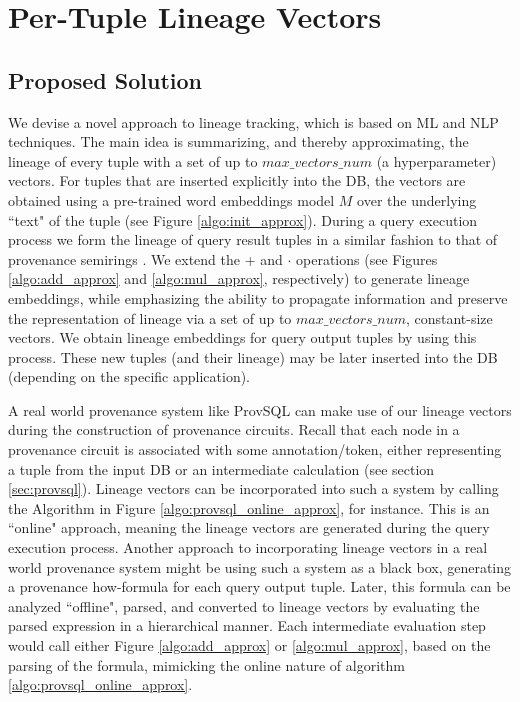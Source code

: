 \chapter{Per-Tuple Lineage Vectors}
\label{chap:per_tuple_lineage_vectors}

\section{Proposed Solution}\label{sec:proposed_solution_approx}
\par We devise a novel approach to lineage tracking, which is based on ML and NLP techniques. The main idea is summarizing, and thereby approximating, the lineage of every tuple with a set of up to $max\_vectors\_num$ (a hyperparameter) vectors. For tuples that are inserted explicitly into the DB, the vectors are obtained using a pre-trained word embeddings model $M$ over the underlying ``text" of the tuple (see Figure \ref{algo:init_approx}).
During a query execution process we form the lineage of query result tuples in a similar fashion to that of provenance semirings \cite{green2007provenance}. We extend the + and $\cdot$ operations (see Figures \ref{algo:add_approx} and
\ref{algo:mul_approx}, respectively) to generate lineage embeddings, while emphasizing the ability to propagate information and preserve the representation of lineage via a set of up to $max\_vectors\_num$, constant-size vectors. We obtain lineage embeddings for query output tuples by using this process. These new tuples (and their lineage) may be later inserted into the DB (depending on the specific application). 
\par A real world provenance system like ProvSQL \cite{provsql_github} can make use of our lineage vectors during the construction of provenance circuits. Recall that each node in a provenance circuit is associated with some annotation/token, either representing a tuple from the input DB or an intermediate calculation (see section \ref{sec:provsql}). Lineage vectors can be incorporated into such a system by calling the Algorithm in Figure \ref{algo:provsql_online_approx}, for instance. This is an ``online" approach, meaning the lineage vectors are generated during the query execution process. Another approach to incorporating lineage vectors in a real world provenance system might be using such a system as a black box, generating a provenance how-formula for each query output tuple. Later, this formula can be analyzed ``offline", parsed, and converted to lineage vectors by evaluating the parsed expression in a hierarchical manner. Each intermediate evaluation step would call either Figure \ref{algo:add_approx} or \ref{algo:mul_approx}, based on the parsing of the formula, mimicking the online nature of algorithm \ref{algo:provsql_online_approx}.


